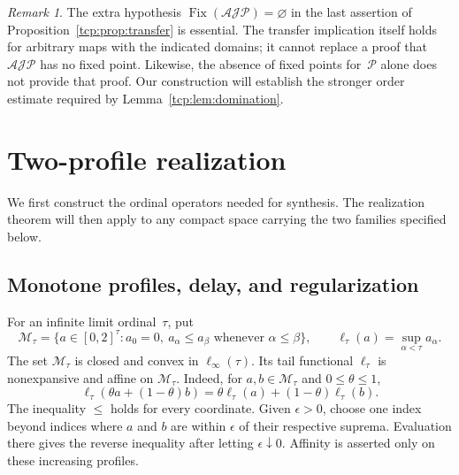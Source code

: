 \documentclass[preprint,12pt,nopreprintline]{elsarticle}
\theoremstyle{definition}
\theoremstyle{remark}
\newtheorem{remark}[theorem]{Remark}
\numberwithin{equation}{section}
\begin{document}
\begin{remark}
The extra hypothesis $\operatorname{Fix}(\mathcal A\mathcal J\mathscr P)=\varnothing$ in the last assertion of Proposition~\ref{tcp:prop:transfer} is essential. The transfer implication itself holds for arbitrary maps with the indicated domains; it cannot replace a proof that $\mathcal A\mathcal J\mathscr P$ has no fixed point. Likewise, the absence of fixed points for~$\mathscr P$ alone does not provide that proof. Our construction will establish the stronger order estimate required by Lemma~\ref{tcp:lem:domination}.
\end{remark}


\section{Two-profile realization}
\label{sec:realization}

We first construct the ordinal operators needed for synthesis. The realization theorem will then apply to any compact space
carrying the two families specified below.

\subsection{Monotone profiles, delay, and regularization}
\label{tcp:subsec:profiles}

For an infinite limit ordinal~$\tau$, put
\[
 \mathcal M_\tau=\big\{a\in[0,2]^\tau:a_0=0,\ a_\alpha\le a_\beta \text{ whenever }\alpha\le\beta\big\},
 \qquad \ell_\tau(a)=\sup_{\alpha<\tau}a_\alpha.
\]
The set $\mathcal M_\tau$ is closed and convex in $\ell_\infty(\tau)$. Its tail functional $\ell_\tau$ is nonexpansive and affine on
$\mathcal M_\tau$. Indeed, for $a,b\in\mathcal M_\tau$ and $0\le\theta\le1$,
\[
 \ell_\tau(\theta a+(1-\theta)b)
 =\theta\ell_\tau(a)+(1-\theta)\ell_\tau(b).
\]
The inequality $\le$ holds for every coordinate. Given $\epsilon>0$, choose one index beyond indices where $a$ and $b$ are within
$\epsilon$ of their respective suprema. Evaluation there gives the reverse inequality after letting $\epsilon\downarrow0$. Affinity is asserted only on these increasing profiles.
\end{document}
